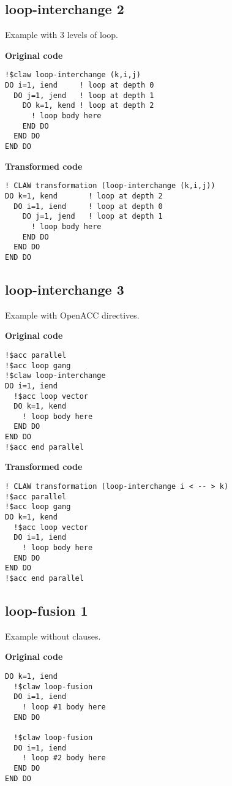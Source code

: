 \documentclass{article}
\begin{document}
\subsection{loop-interchange 2}
\label{loop-interchange2}
Example with 3 levels of loop. 

\textbf{Original code}
\begin{lstlisting}
!$claw loop-interchange (k,i,j)
DO i=1, iend     ! loop at depth 0
  DO j=1, jend   ! loop at depth 1
    DO k=1, kend ! loop at depth 2
      ! loop body here
    END DO
  END DO
END DO
\end{lstlisting}

\textbf{Transformed code}
\begin{lstlisting}
! CLAW transformation (loop-interchange (k,i,j))
DO k=1, kend       ! loop at depth 2
  DO i=1, iend     ! loop at depth 0
    DO j=1, jend   ! loop at depth 1
      ! loop body here
    END DO
  END DO
END DO
\end{lstlisting}

\subsection{loop-interchange 3}
\label{loop-interchange3}
Example with OpenACC directives. 

\textbf{Original code}
\begin{lstlisting}
!$acc parallel
!$acc loop gang
!$claw loop-interchange
DO i=1, iend
  !$acc loop vector
  DO k=1, kend
    ! loop body here
  END DO
END DO
!$acc end parallel
\end{lstlisting}

\textbf{Transformed code}
\begin{lstlisting}
! CLAW transformation (loop-interchange i < -- > k)
!$acc parallel
!$acc loop gang
DO k=1, kend
  !$acc loop vector
  DO i=1, iend
    ! loop body here
  END DO
END DO
!$acc end parallel
\end{lstlisting}

\subsection{loop-fusion 1}
Example without clauses. 

\textbf{Original code}
\begin{lstlisting}
DO k=1, iend
  !$claw loop-fusion
  DO i=1, iend
    ! loop #1 body here
  END DO

  !$claw loop-fusion
  DO i=1, iend
    ! loop #2 body here
  END DO
END DO
\end{lstlisting}
\end{document}
